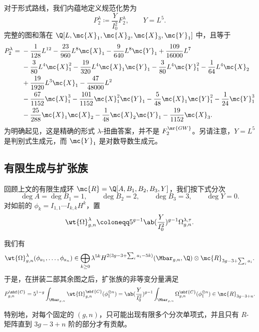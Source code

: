 对于形式路线，我们内蕴地定义规范化势为
\[ P_2^{\lambda} \coloneqq \frac{Y}{I_0^2}F_2^{\lambda}, \qquad Y = L^5. \]
完整的图和落在 \(\Q[L,\mc{X}_1,\mc{X}_2,\mc{X}_3,\mc{Y}_1]\) 中，且等于
\begin{align*}
    P_2^{\lambda} ={}& -\frac{1}{128}L^{12} - \frac{23}{960}L^8\mc{X}_1 - \frac{9}{640}L^8\mc{Y}_1 + \frac{109}{16000}L^7 \\
    &- \frac{3}{80}L^4\mc{X}_1^2 - \frac{19}{320}L^4\mc{X}_1\mc{Y}_1 - \frac{3}{80}L^4\mc{Y}_1^2 - \frac{1}{64}L^4\mc{X}_2 \\
    &+ \frac{19}{1920}L^3\mc{X}_1 - \frac{47}{48000}L^2 \\
    &- \frac{67}{1152}\mc{X}_1^3 - \frac{101}{1152}\mc{X}_1^2\mc{Y}_1 - \frac{5}{48}\mc{X}_1\mc{Y}_1^2 - \frac{1}{24}\mc{Y}_1^3 \\
    &- \frac{25}{288}\mc{X}_1\mc{X}_2 - \frac{1}{48}\mc{X}_2\mc{Y}_1 - \frac{19}{1152}\mc{X}_3.
\end{align*}
为明确起见，这是精确的形式 \(\lambda\)-扭曲答案，并不是 \(F_2^{\mr{GW}}\)。另请注意，\(Y = L^5\) 是判别式生成元，而 \(\mc{Y}_1\) 是对数导数生成元。

\subsection{有限生成与扩张族}%
\label{sub:Finite generation and the extended family}

回顾上文的有限生成环 \(\mc{R} = \Q[A,B_1,B_2,B_3,Y]\)，我们按下式分次
\[ \deg A = \deg B_1 = 1, \qquad \deg B_2 = 2, \qquad \deg B_3 = 3, \qquad \deg Y = 0. \]
对如前的 \(\phi_k = I_{1,1}\cdots I_{k,k}H^k\)，置
\[ \wt{\Omega}^{\lambda}_{g,n} \coloneqq 5^{g-1}\ab(\frac{Y}{I_0^2})^{g-1}\Omega^{\lambda,\tau}_{g,n}. \]

\begin{thm}%
\label{thm:graded finite generation}
    我们有
    \[ \wt{\Omega}^{\lambda}_{g,n}(\phi_{a_1}, \ldots, \phi_{a_n}) \in \bigoplus_{k \geq 0}\lambda^{5k}H^{2(3g-3+\sum_i a_i - 5k)}(\Mbar_{g,n},\Q)\otimes \mc{R}_{3g-3+\sum_i a_i}. \]
    于是，在拼装二部其余图之后，扩张族的非等变分量满足
    \[ P^{\mbf{C}}_{g,n} = 5^{1-g}\int_{\Mbar_{g,n}}\wt{\Omega}^{\mbf{C}}_{g,n}(\phi_1^{\otimes n}) = \ab( \frac{Y}{I_0^2})^{g-1}\int_{\Mbar_{g,n}}\Omega^{\mbf{C}}_{g,n}(\phi_1^{\otimes n}) \in \mc{R}_{3g-3+n}. \]
\end{thm}

特别地，对每个固定的 \((g,n)\)，只可能出现有限多个分次单项式，并且只有 \(R\)-矩阵直到 \(3g-3+n\) 阶的部分才有贡献。

